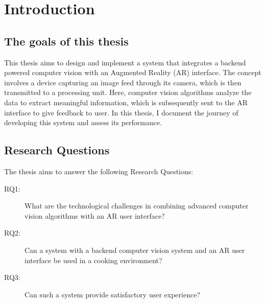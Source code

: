 \chapter{Introduction} \label{intro}

\section{The goals of this thesis} \label{goals}
This thesis aims to design and implement a system that integrates a backend 
powered computer vision with an Augmented Reality (AR) interface. The concept 
involves a device capturing an image feed through its camera, which is then 
transmitted to a processing unit. Here, computer vision algorithms analyze 
the data to extract meaningful information, which is subsequently sent to the 
AR interface to give feedback to user. In this thesis, I document the journey 
of developing this system and assess its performance.

\section{Research Questions} \label{rq}
The thesis aims to answer the following Research Questions:
\begin{description}
	\item[RQ1:] \label{rq1} What are the technological challenges in 
	combining advanced computer vision algorithms with an AR user interface?

	\item[RQ2:] \label{rq2} Can a system with a backend computer vision 
	system and an AR user interface be used in a cooking environment?

	\item[RQ3:] \label{rq3} Can such a system provide satisfactory user 
	experience?
\end{description}

